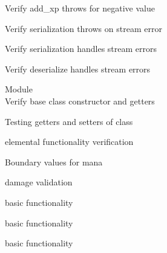 \begin{DoxyRefList}
\label{test__test000095}%
%
Verify add\+\_\+xp throws for negative value  



\label{test__test000108}%
%
Verify serialization throws on stream error  



\label{test__test000111}%
%
Verify serialization handles stream errors  



\label{test__test000112}%
%
Verify deserialize handles stream errors  


\item[Module \doxylink{group___g_c_i}{GCI} ]\hfill \\
\label{test__test000001}%
%
Verify base  class constructor and getters  



\label{test__test000002}%
%
Testing getters and setters of  class  



\label{test__test000007}%
%
 elemental functionality verification  



\label{test__test000008}%
%
Boundary values for  mana  



\label{test__test000009}%
%
 damage validation  



\label{test__test000021}%
%
 basic functionality  



\label{test__test000026}%
%
 basic functionality  



\label{test__test000031}%
%
 basic functionality  




\end{DoxyRefList}
